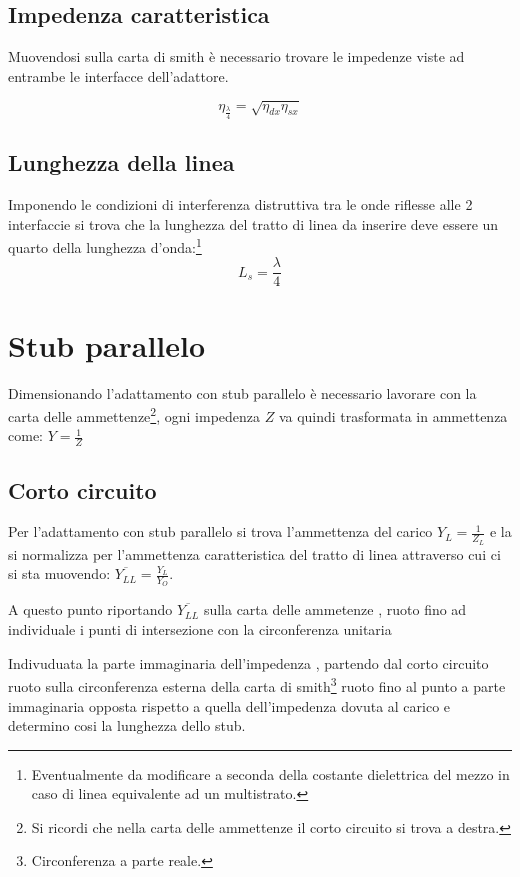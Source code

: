 \documentclass[10pt,a4paper]{report}
\begin{document}
		\subsection{Impedenza caratteristica}
				Muovendosi sulla carta di smith è necessario trovare le impedenze viste ad entrambe le interfacce dell'adattore.

				\begin{equation}
				\eta_{\frac{\lambda}{4}}=\sqrt{\eta_{dx}\eta_{sx}}
				\end{equation}

		\subsection{Lunghezza della linea}
				Imponendo le condizioni di interferenza distruttiva tra le onde riflesse alle 2 interfaccie si trova che la lunghezza del tratto di linea da inserire deve essere un quarto della lunghezza d'onda:\footnote{Eventualmente da modificare a seconda della costante dielettrica del mezzo in caso di linea equivalente ad un multistrato.}
				\begin{equation}
				L_s= \frac {\lambda} {4}
				\end{equation}

	\section{Stub parallelo}

		Dimensionando l'adattamento con stub parallelo è necessario lavorare con la carta delle ammettenze\footnote{Si ricordi che nella carta delle ammettenze il corto circuito si trova a destra.}, ogni impedenza $Z$ va quindi trasformata in ammettenza come: $Y=\frac{1}{Z}$

		\subsection{Corto circuito}
				
			Per l'adattamento con stub parallelo si trova l'ammettenza del carico $Y_L=\frac{1}{Z_L}$ e la si normalizza per l'ammettenza caratteristica del tratto di linea attraverso cui ci si sta muovendo: $\overline{Y_{LL}}=\frac{Y_L}{Y_O}$.


			A questo punto riportando $\overline{Y_{LL}}$ sulla carta delle ammetenze , ruoto fino ad individuale i punti di intersezione con la circonferenza unitaria

			Indivuduata la parte immaginaria dell'impedenza , partendo dal corto circuito ruoto sulla circonferenza esterna della carta di smith\footnote{Circonferenza a parte reale.} ruoto fino al punto a parte immaginaria opposta rispetto a quella dell'impedenza dovuta al carico e determino cosi la lunghezza dello stub.
\end{document}
